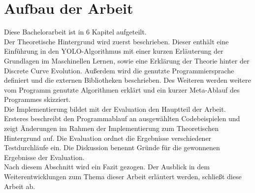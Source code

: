 \section{Aufbau der Arbeit} 
{Diese Bachelorarbeit ist in 6 Kapitel aufgeteilt. \\ 
Der Theoretische Hintergrund wird zuerst beschrieben. Dieser enthält eine Einführung in den YOLO-Algorithmus mit einer kurzen Erläuterung der Grundlagen im Maschinellen Lernen, sowie eine Erklärung der Theorie hinter der Discrete Curve Evolution. Außerdem wird die genutzte Programmiersprache definiert und die externen Bibliotheken beschrieben. Des Weiteren werden weitere vom Programm genutzte Algorithmen erklärt und ein kurzer Meta-Ablauf des Programmes skizziert. \\
Die Implementierung bildet mit der Evaluation den Hauptteil der Arbeit. Ersteres beschreibt den Programmablauf an ausgewählten Codebeispielen und zeigt Änderungen im Rahmen der Implementierung zum Theoretischen Hintergrund auf. Die Evaluation ordnet die Ergebnisse verschiedener Testdurchläufe ein. Die Diskussion benennt Gründe für die gewonnenen Ergebnisse der Evaluation. \\
Nach diesem Abschnitt wird ein Fazit gezogen. Der Ausblick in dem Weiterentwicklungen zum Thema dieser Arbeit erläutert werden, schließt diese Arbeit ab. }




